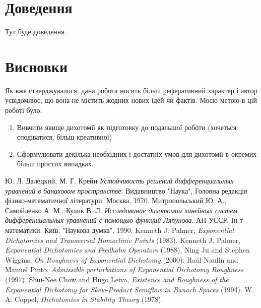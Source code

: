\documentclass[14pt]{extarticle} %
\theoremstyle{remark}
\begin{document}
\section{Доведення}
Тут буде доведення.
\section{Висновки}
Як вже стверджувалося, дана робота носить більш реферативний характер і автор усвідомлює, що вона не містить жодних нових ідей чи фактів.
Моєю метою в цій роботі було:
\begin{enumerate}
	\item{Вивчити явище дихотомії як підготовку до подальшої роботи (хочеться сподіватися, більш креативної)
		}
	\item{Сформулювати декілька необхідних і достатніх умов для дихотомії в окремих більш простих випадках.}
\end{enumerate}
\begin{thebibliography}{9}
Ю. Л. Далецкий, М. Г. Крейн
\emph{Устойчивость решений дифференциальных уравнений в банаховом пространстве}.
Видавництво "Наука"{}, Головна редакція фізико-математичної літератури. Москва, 1970.
Митропольський Ю. А., Самойленко А. М., Кулик В. Л.
\emph{Исследование дихотомии линейных систем дифференциальных уравнений с помощью функций Ляпунова}.
АН УССР. Ін-т математики. Київ, "Наукова думка", 1990.
	Kenneth J. Palmer, {\em Exponential Dichotomies and Transversal Homoclinic Points} (1983).
	Kenneth J. Palmer, {\em Exponential Dichotomies and Fredholm Operators} (1988).
	Ning Ju and Stephen Wiggins, {\em On Roughness of Exponential Dichotomy} (2000).
	Ra\'ul Naulin and Manuel Pinto, {\em Admissible perturbations of Exponential Dichotomy Roughness} (1997).
	Shui-Nee Chow and Hugo Leiva, {\em Existence and Roughness of the Exponential Dichotomy for Skew-Product Semiflow in Banach Spaces} (1994).
	W. A. Coppel, {\em Dichotomies in Stability Theory} (1978).
\end{thebibliography}
\end{document}
